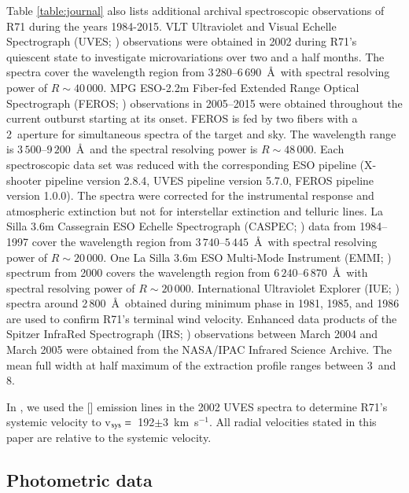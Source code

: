 \documentclass[structabstract]{aa}
\begin{document}
Table \ref{table:journal} also lists additional archival spectroscopic observations of R71 during the years 1984-2015. 
VLT Ultraviolet and Visual Echelle Spectrograph (UVES; \citealt{2000SPIE.4008..534D}) observations were obtained in 2002 during R71's quiescent state to investigate microvariations over two and a half months. The spectra cover the wavelength region from $3\,280$--$6\,690$~\AA\ with spectral resolving power of $R\sim40\,000$.  MPG ESO-2.2m Fiber-fed Extended Range Optical Spectrograph (FEROS; \citealt{1999Msngr..95....8K}) observations in 2005--2015 were obtained throughout the current outburst starting at its onset. FEROS is fed by two fibers with a 2\arcsec\ aperture for simultaneous spectra of the target and sky. The wavelength range is $3\,500$--$9\,200$~\AA\ and the spectral resolving power is $R\sim48\,000$. Each spectroscopic data set was reduced with the corresponding ESO pipeline (X-shooter pipeline version 2.8.4, UVES pipeline version 5.7.0, FEROS pipeline version 1.0.0). The spectra were corrected for the instrumental response and atmospheric extinction but not for interstellar extinction and telluric lines.
La Silla 3.6m Cassegrain ESO Echelle Spectrograph (CASPEC; \citealt{1979Msngr..17...27L}) data from 1984--1997 cover the wavelength region from $3\,740$--$5\,445$~\AA\ with spectral resolving power of $R\sim20\,000$. One La Silla 3.6m ESO Multi-Mode Instrument (EMMI; \citealt{
1986SPIE..627..339D}) spectrum from 2000 covers the wavelength region from $6\,240$--$6\,870$~\AA\ with spectral resolving power of $R\sim20\,000$.  International Ultraviolet Explorer (IUE; \citealt{1976MmSAI..47..431M}) spectra around 2\,800~\AA\ obtained during minimum phase in 1981, 1985, and 1986 are used to confirm R71's terminal wind velocity.
Enhanced data products of the Spitzer InfraRed Spectrograph (IRS; \citealt{2004ApJS..154...18H}) observations between March 2004 and March 2005 were obtained from the NASA/IPAC Infrared Science Archive. The mean full width at half maximum of the extraction profile ranges between 3\arcsec\ and 8\arcsec.

In \citet{2013A&A...555A.116M}, we used the [] emission lines in the 2002 UVES spectra to determine R71's systemic velocity to v$_{\textnormal{\scriptsize{sys}}} =$~192$\pm$3~km~s$^{-1}$. All radial velocities stated in this paper are relative to the systemic velocity.


\subsection{Photometric data}
\label{obs:phot}
\end{document}
